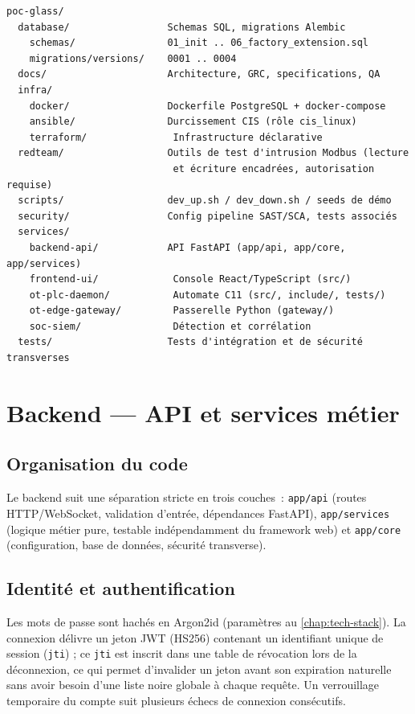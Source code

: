 \documentclass[11pt,a4paper]{report}
\begin{document}
\begin{lstlisting}[language={}]
poc-glass/
  database/                 Schemas SQL, migrations Alembic
    schemas/                01_init .. 06_factory_extension.sql
    migrations/versions/    0001 .. 0004
  docs/                     Architecture, GRC, specifications, QA
  infra/
    docker/                 Dockerfile PostgreSQL + docker-compose
    ansible/                Durcissement CIS (rôle cis_linux)
    terraform/               Infrastructure déclarative
  redteam/                  Outils de test d'intrusion Modbus (lecture
                             et écriture encadrées, autorisation requise)
  scripts/                  dev_up.sh / dev_down.sh / seeds de démo
  security/                 Config pipeline SAST/SCA, tests associés
  services/
    backend-api/            API FastAPI (app/api, app/core, app/services)
    frontend-ui/             Console React/TypeScript (src/)
    ot-plc-daemon/           Automate C11 (src/, include/, tests/)
    ot-edge-gateway/         Passerelle Python (gateway/)
    soc-siem/                Détection et corrélation
  tests/                    Tests d'intégration et de sécurité transverses
\end{lstlisting}

\chapter{Backend --- API et services métier}

\section{Organisation du code}
Le backend suit une séparation stricte en trois couches~: \texttt{app/api}
(routes HTTP/WebSocket, validation d'entrée, dépendances FastAPI),
\texttt{app/services} (logique métier pure, testable indépendamment du
framework web) et \texttt{app/core} (configuration, base de données,
sécurité transverse).

\section{Identité et authentification}
Les mots de passe sont hachés en Argon2id (paramètres au
\cref{chap:tech-stack}). La connexion délivre un jeton JWT (HS256) contenant un
identifiant unique de session (\texttt{jti}) ; ce \texttt{jti} est inscrit dans
une table de révocation lors de la déconnexion, ce qui permet d'invalider un
jeton avant son expiration naturelle sans avoir besoin d'une liste noire
globale à chaque requête. Un verrouillage temporaire du compte suit plusieurs
échecs de connexion consécutifs.
\end{document}
